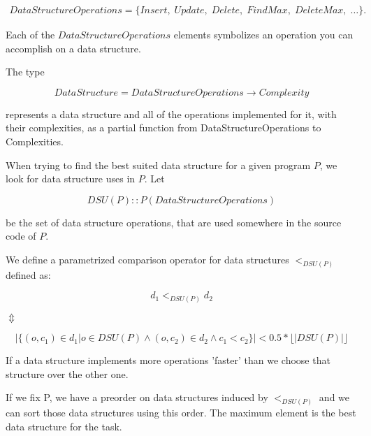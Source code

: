 \documentclass[11pt]{article}
\begin{document}
		\begin{eqnarray}
			DataStructureOperations = \{Insert, \; Update, \; Delete, \; FindMax,\; DeleteMax, \; \dots\}.
		\end{eqnarray}

		Each of the $DataStructureOperations$ elements symbolizes an operation you can accomplish on a data
		structure.

		The type

		\begin{equation}\label{data-structure-type}
			DataStructure = DataStructureOperations \rightarrow Complexity
		\end{equation}

		represents a data structure and all of the operations implemented for it, with their complexities, as a
		partial function from DataStructureOperations to Complexities.

		When trying to find the best suited data structure for a given program $P$, we look for data structure
		uses in $P$. Let

		\begin{equation}\label{dsu-type}
			DSU(P) :: P(DataStructureOperations)
		\end{equation}

		be the set of data structure operations, that are used somewhere in the source code of $P$.

		We define a parametrized comparison operator for data structures $<_{DSU(P)}$ defined as:

		\begin{center}

			\begin{equation}
				d_1 <_{DSU(P)} d_2
			\end{equation}

			$\Updownarrow$

			\begin{equation} \label{data-structure-order}
				|\{(o, c_1) \in d_1 | o \in DSU(P) \wedge (o,c_2) \in d_2 \wedge c_1 < c_2 \}| < 0.5 *
				\lfloor |DSU(P)| \rfloor
			\end{equation}

		\end{center} If a data structure implements more operations 'faster' than we choose that structure over
		the other one.

		If we fix P, we have a preorder on data structures induced by $<_{DSU(P)}$ and we can sort those data
		structures using this order. The maximum element is the best data structure for the task.
\end{document}
